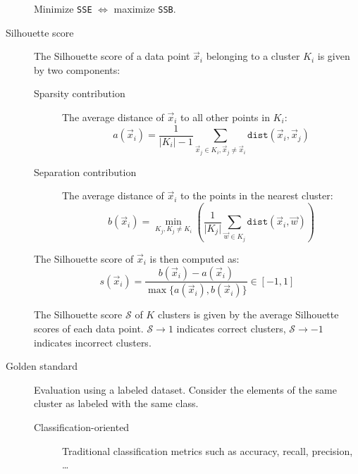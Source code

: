 \begin{description}
        \begin{theorem}
            Minimize \texttt{SSE} $\iff$ maximize \texttt{SSB}.
        \end{theorem}
        
    \item[Silhouette score] 
        The Silhouette score of a data point $\vec{x}_i$ belonging to a cluster $K_i$ is given by two components:
        \begin{description}
            \item[Sparsity contribution] 
                The average distance of $\vec{x}_i$ to all other points in $K_i$:
                \[ a(\vec{x}_i) = \frac{1}{\vert K_i \vert - 1} \sum_{\vec{x}_j \in K_i, \vec{x}_j \neq \vec{x}_i} \texttt{dist}(\vec{x}_i, \vec{x}_j) \]
            
            \item[Separation contribution] 
                The average distance of $\vec{x}_i$ to the points in the nearest cluster:
                \[ b(\vec{x}_i) = \min_{K_j, K_j \neq K_i} \left( \frac{1}{\vert K_j \vert} \sum_{\vec{w} \in K_j} \texttt{dist}(\vec{x}_i, \vec{w}) \right) \]
        \end{description}
        The Silhouette score of $\vec{x}_i$ is then computed as:
        \[ s(\vec{x}_i) = \frac{b(\vec{x}_i) - a(\vec{x}_i)}{\max\{ a(\vec{x}_i), b(\vec{x}_i) \}} \in [-1, 1] \]
        
        The Silhouette score $\mathcal{S}$ of $K$ clusters is given by the average Silhouette scores of each data point.
        $\mathcal{S} \rightarrow 1$ indicates correct clusters, $\mathcal{S} \rightarrow -1$ indicates incorrect clusters.

    \item[Golden standard] 
        Evaluation using a labeled dataset.
        Consider the elements of the same cluster as labeled with the same class.

        \begin{description}
            \item[Classification-oriented] 
                Traditional classification metrics such as accuracy, recall, precision, \dots


\end{description}
\end{description}
